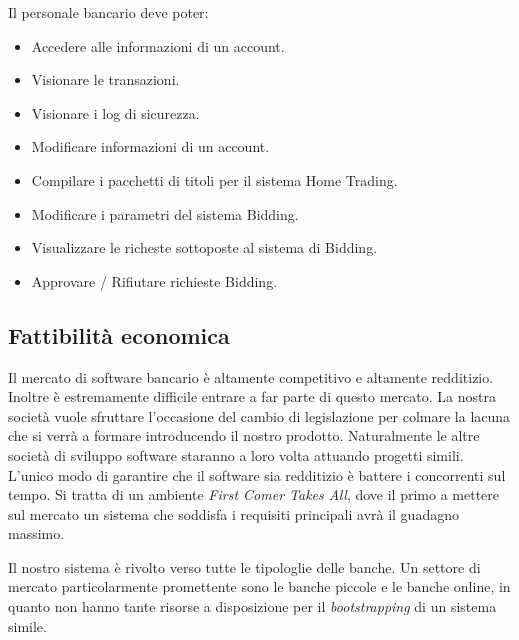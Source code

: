 \documentclass[10pt]{softeng} %
\begin{document}
Il personale bancario deve poter:
\begin{itemize}
    \item Accedere alle informazioni di un account.
    \item Visionare le transazioni.
    \item Visionare i log di sicurezza.
    \item Modificare informazioni di un account.
    \item Compilare i pacchetti di titoli per il sistema Home Trading.
    \item Modificare i parametri del sistema Bidding.
    \item Visualizzare le richeste sottoposte al sistema di Bidding.
    \item Approvare / Rifiutare richieste Bidding.
\end{itemize}



\subsection{Fattibilit\`a economica}

Il mercato di software bancario \`e altamente competitivo e altamente redditizio.
Inoltre \`e estremamente difficile entrare a far parte di questo mercato.
La nostra societ\`a vuole sfruttare l'occasione del cambio di legislazione per colmare la lacuna che si verr\`a a formare introducendo il nostro prodotto.
Naturalmente le altre societ\`a di sviluppo software staranno a loro volta attuando progetti simili.
L'unico modo di garantire che il software sia redditizio \`e battere i concorrenti sul tempo.
Si tratta di un ambiente \emph{First Comer Takes All}, dove il primo a mettere sul mercato un sistema che soddisfa i requisiti principali avr\`a il guadagno massimo.

Il nostro sistema \`e rivolto verso tutte le tipologlie delle banche.
Un settore di mercato particolarmente promettente sono le banche piccole e le banche online, in quanto non hanno tante risorse a disposizione per il \emph{bootstrapping} di un sistema simile.
\end{document}
